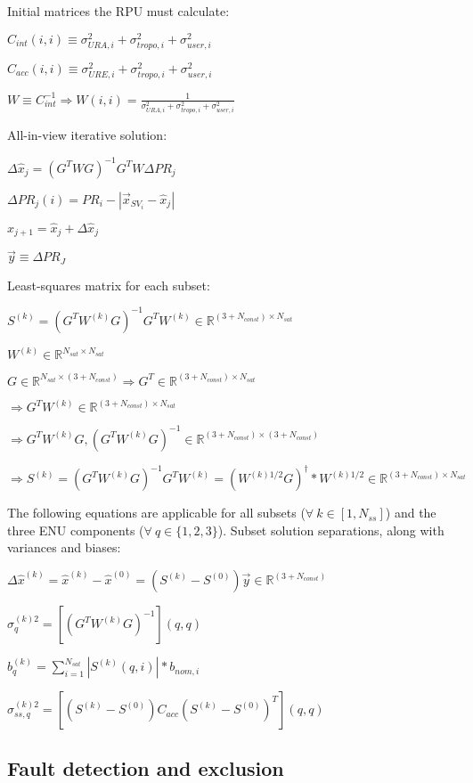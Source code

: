 \documentclass[11pt]{article}
\begin{document}
Initial matrices the RPU must calculate:

$C_{int}(i,i) \equiv \sigma_{URA,i}^2 + \sigma_{tropo,i}^2 + \sigma_{user,i}^2$

$C_{acc}(i,i) \equiv \sigma_{URE,i}^2 + \sigma_{tropo,i}^2 + \sigma_{user,i}^2$

$W \equiv C_{int}^{-1} \Rightarrow W(i,i)=\frac{1}{\sigma_{URA,i}^2 + \sigma_{tropo,i}^2 + \sigma_{user,i}^2}$

All-in-view iterative solution:

$\Delta \hat{x}_j=(G^T W G)^{-1} G^T W \Delta PR_j$

$\Delta PR_j(i)=PR_i-|\vec{x}_{SV_{i}}-\hat{x}_j|$

$\hat{x}_{j+1} = \hat{x}_j + \Delta \hat{x}_j$

$\vec{y} \equiv \Delta PR_J$

Least-squares matrix for each subset:

$S^{(k)} = (G^T W^{(k)} G)^{-1} G^T W^{(k)} \in \mathbb{R}^{(3+N_{const}) \times N_{sat}}$

$W^{(k)} \in \mathbb{R}^{N_{sat} \times N_{sat}}$

$G \in \mathbb{R}^{N_{sat} \times (3+N_{const})} \Rightarrow G^T \in \mathbb{R}^{(3+N_{const}) \times N_{sat}}$

$\Rightarrow G^T W^{(k)} \in \mathbb{R}^{(3+N_{const}) \times N_{sat}}$

$\Rightarrow G^T W^{(k)} G, (G^T W^{(k)} G)^{-1} \in \mathbb{R}^{(3+N_{const}) \times (3+N_{const})}$

$\Rightarrow S^{(k)} = (G^T W^{(k)} G)^{-1} G^T W^{(k)} = (W^{(k)1/2} G)^{\dagger} * W^{(k)1/2} \in \mathbb{R}^{(3+N_{const}) \times N_{sat}}$

The following equations are applicable for all subsets ($\forall \ k \in [1,N_{ss}]$) and the three ENU components ($\forall \ q \in \{1,2,3\}$). Subset solution separations, along with variances and biases:

$\Delta \hat{x}^{(k)} = \hat{x}^{(k)} - \hat{x}^{(0)} = (S^{(k)} - S^{(0)})\vec{y} \in \mathbb{R}^{(3+N_{const})}$

$\sigma_q^{(k)2} = [(G^T W^{(k)} G)^{-1}](q,q)$

$b_q^{(k)} = \sum_{i=1}^{N_{sat}}|S^{(k)}(q,i)|*b_{nom,i}$

$\sigma_{ss,q}^{(k)2} = [(S^{(k)}-S^{(0)})C_{acc}(S^{(k)}-S^{(0)})^T](q,q)$

\subsection{Fault detection and exclusion}
\end{document}
